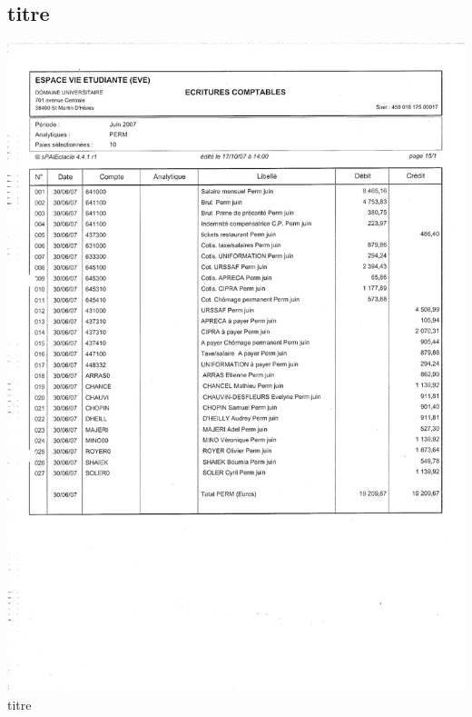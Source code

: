 \subsection{titre}
\begin{center}
\includegraphics[scale=0.6]{annexes/images/bilan_annuel_ecritures_comptables.pdf} \\
titre
\end{center}
